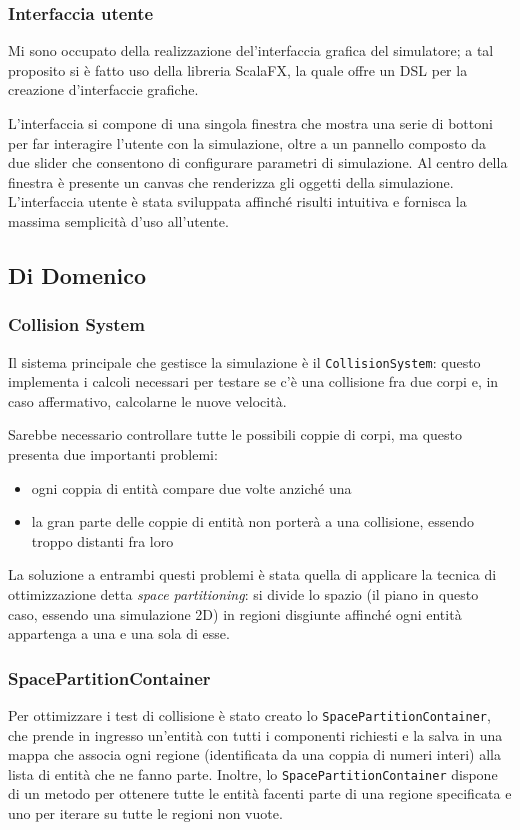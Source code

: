 \subsubsection{Interfaccia utente}
Mi sono occupato della realizzazione del'interfaccia grafica del simulatore;
a tal proposito si è fatto uso della libreria ScalaFX, la quale offre un DSL per la creazione d'interfaccie grafiche.

L'interfaccia si compone di una singola finestra che mostra una serie di bottoni per far interagire l'utente con la
simulazione, oltre a un pannello composto da due slider che consentono di configurare parametri di simulazione.
Al centro della finestra è presente un canvas che renderizza gli oggetti della simulazione.
L'interfaccia utente è stata sviluppata affinché risulti intuitiva e fornisca la massima semplicità d'uso all'utente.

\subsection{Di Domenico}\label{subsec:demo-di-domenico}

\subsubsection{Collision System}\label{subsubsec:container}
Il sistema principale che gestisce la simulazione è il \texttt{CollisionSystem}: questo implementa i calcoli necessari
per testare se c'è una collisione fra due corpi e, in caso affermativo, calcolarne le nuove velocità.

Sarebbe necessario controllare tutte le possibili coppie di corpi, ma questo presenta due importanti problemi:
\begin{itemize}
    \item ogni coppia di entità compare due volte anziché una
    \item la gran parte delle coppie di entità non porterà a una collisione, essendo troppo distanti fra loro
\end{itemize}

La soluzione a entrambi questi problemi è stata quella di applicare la tecnica di ottimizzazione detta
\textit{space partitioning}: si divide lo spazio (il piano in questo caso, essendo una simulazione 2D) in regioni
disgiunte affinché ogni entità appartenga a una e una sola di esse.

\subsubsection{SpacePartitionContainer}
Per ottimizzare i test di collisione è stato creato lo \texttt{SpacePartitionContainer}, che prende in ingresso
un'entità con tutti i componenti richiesti e la salva in una mappa che associa ogni regione (identificata da una coppia
di numeri interi) alla lista di entità che ne fanno parte.
Inoltre, lo \texttt{SpacePartitionContainer} dispone di un metodo per ottenere tutte le entità facenti parte di una
regione specificata e uno per iterare su tutte le regioni non vuote.

